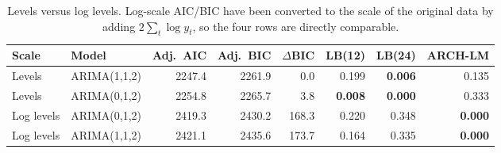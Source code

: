 \begin{table}[H]\centering\small
\caption{Levels versus log levels. Log-scale AIC/BIC have been converted to the scale of the original data by adding $2\sum_t \log y_t$, so the four rows are directly comparable.}\label{tab:lvslog}
\begin{tabular}{llrrrrrr}\toprule Scale & Model & Adj.\ AIC & Adj.\ BIC & $\Delta$BIC & LB(12) & LB(24) & ARCH-LM\\\midrule
Levels & ARIMA(1,1,2) & 2247.4 & 2261.9 & 0.0 & 0.199 & \textbf{0.006} & 0.135\\
Levels & ARIMA(0,1,2) & 2254.8 & 2265.7 & 3.8 & \textbf{0.008} & \textbf{0.000} & 0.333\\
Log levels & ARIMA(0,1,2) & 2419.3 & 2430.2 & 168.3 & 0.220 & 0.348 & \textbf{0.000}\\
Log levels & ARIMA(1,1,2) & 2421.1 & 2435.6 & 173.7 & 0.164 & 0.335 & \textbf{0.000}\\
\bottomrule\end{tabular}
\end{table}